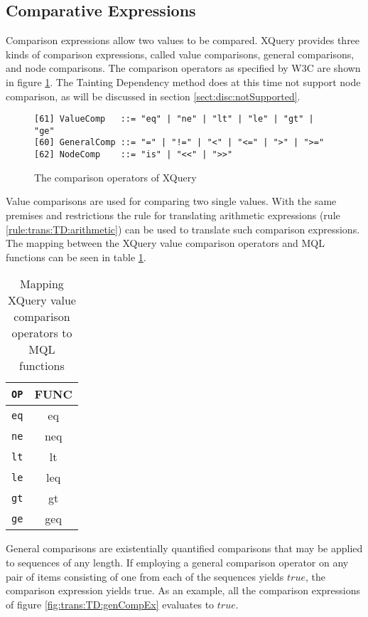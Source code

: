 \subsection{Comparative Expressions}
\label{sect:trans:TD:compArit}
Comparison expressions allow two values to be compared. XQuery provides three kinds of comparison expressions,
called value comparisons, general comparisons, and node comparisons. The comparison operators as specified by W3C
are shown in figure \ref{fig:trans:TD:compEBNF}. The Tainting Dependency method does at this time not support node
comparison, as will be discussed in section \ref{sect:disc:notSupported}.

\begin{figure}[h]
\begin{Verbatim}
[61] ValueComp   ::= "eq" | "ne" | "lt" | "le" | "gt" | "ge"
[60] GeneralComp ::= "=" | "!=" | "<" | "<=" | ">" | ">="
[62] NodeComp    ::= "is" | "<<" | ">>"
\end{Verbatim}
\caption{The comparison operators of XQuery \cite{w3c00}}
\label{fig:trans:TD:compEBNF}
\end{figure}

Value comparisons are used for comparing two single values. With the same premises and restrictions the rule for
translating arithmetic expressions (rule \ref{rule:trans:TD:arithmetic}) can be used to translate such comparison
expressions. The mapping between the XQuery value comparison operators and MQL
functions can be seen in table \ref{tab:trans:TD:valueComp}.

\begin{table}[h]
\centering
\begin{tabular}{c|c}
\texttt{OP} & \textsf{FUNC} \\ \hline
\texttt{eq} & \textsf{eq} \\
\texttt{ne} & \textsf{neq} \\
\texttt{lt} & \textsf{lt} \\
\texttt{le} & \textsf{leq} \\
\texttt{gt} & \textsf{gt} \\
\texttt{ge} & \textsf{geq} \\
\end{tabular}
\label{tab:trans:TD:valueComp}
\caption{Mapping XQuery value comparison operators to MQL functions}
\end{table}

General comparisons are existentially quantified comparisons that may be applied to sequences of any length. If
employing a general comparison operator on any pair of items consisting of one
from each of the sequences yields $true$, the comparison expression yields true. As an example, all the comparison expressions of figure
\ref{fig:trans:TD:genCompEx} evaluates to $true$.

